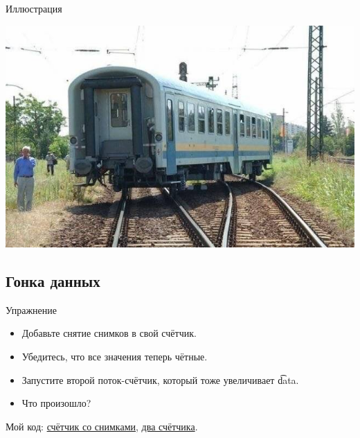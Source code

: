 \begin{frame}{Иллюстрация}
	\begin{center}
		\includegraphics[scale=0.6]{race-condition.jpg}
	\end{center}
\end{frame}

\subsection{Гонка данных}
\begin{frame}{Упражнение}
	\begin{itemize}
		\item Добавьте снятие снимков в свой счётчик.
		\item Убедитесь, что все значения теперь чётные.
		\item Запустите второй поток-счётчик, который тоже увеличивает \t{data}.
		\item Что произошло?
	\end{itemize}
	Мой код:
	\href{https://github.com/yeputons/fall-2017-paradigms/raw/master/171023/sources/07-even-counter-snapshot.cpp}{счётчик со снимками},
	\href{https://github.com/yeputons/fall-2017-paradigms/raw/master/171023/sources/08-two-threads.cpp}{два счётчика}.
\end{frame}

